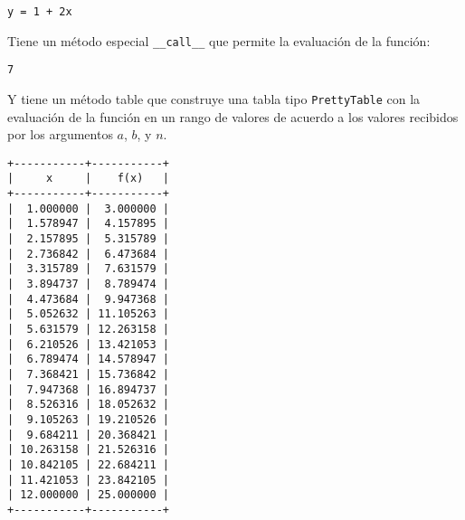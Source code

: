 \begin{Shaded}
\begin{Highlighting}[]
\OperatorTok{=}\NormalTok{,}\NormalTok{)}
\end{Highlighting}
\end{Shaded}

\begin{verbatim}
y = 1 + 2x
\end{verbatim}

Tiene un método especial \texttt{\_\_call\_\_} que permite la evaluación de la función:

\begin{Shaded}
\begin{Highlighting}[]
\NormalTok{)}
\end{Highlighting}
\end{Shaded}

\begin{verbatim}
7
\end{verbatim}

Y tiene un método table que construye una tabla tipo \texttt{PrettyTable} con la evaluación de la función en un rango de
valores de acuerdo a los valores recibidos por los argumentos \(a\), \(b\), y \(n\).

\begin{Shaded}
\begin{Highlighting}[]
\OperatorTok{=}\OperatorTok{=}\OperatorTok{=}\NormalTok{)}
\end{Highlighting}
\end{Shaded}

\begin{verbatim}
+-----------+-----------+
|     x     |    f(x)   |
+-----------+-----------+
|  1.000000 |  3.000000 |
|  1.578947 |  4.157895 |
|  2.157895 |  5.315789 |
|  2.736842 |  6.473684 |
|  3.315789 |  7.631579 |
|  3.894737 |  8.789474 |
|  4.473684 |  9.947368 |
|  5.052632 | 11.105263 |
|  5.631579 | 12.263158 |
|  6.210526 | 13.421053 |
|  6.789474 | 14.578947 |
|  7.368421 | 15.736842 |
|  7.947368 | 16.894737 |
|  8.526316 | 18.052632 |
|  9.105263 | 19.210526 |
|  9.684211 | 20.368421 |
| 10.263158 | 21.526316 |
| 10.842105 | 22.684211 |
| 11.421053 | 23.842105 |
| 12.000000 | 25.000000 |
+-----------+-----------+
\end{verbatim}

